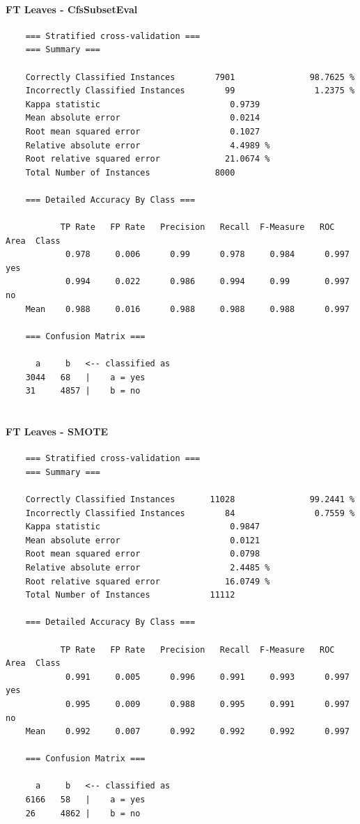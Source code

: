 \pagebreak
\paragraph{FT Leaves - CfsSubsetEval}
{\scriptsize
	\begin{verbatim}
	=== Stratified cross-validation ===
	=== Summary ===
	
	Correctly Classified Instances        7901               98.7625 %
	Incorrectly Classified Instances        99                1.2375 %
	Kappa statistic                          0.9739
	Mean absolute error                      0.0214
	Root mean squared error                  0.1027
	Relative absolute error                  4.4989 %
	Root relative squared error             21.0674 %
	Total Number of Instances             8000     
	
	=== Detailed Accuracy By Class ===
	
	       TP Rate   FP Rate   Precision   Recall  F-Measure   ROC Area  Class
	        0.978     0.006      0.99      0.978     0.984      0.997    yes
	        0.994     0.022      0.986     0.994     0.99       0.997    no
	Mean    0.988     0.016      0.988     0.988     0.988      0.997
	
	=== Confusion Matrix ===
	
	  a     b   <-- classified as
	3044   68   |    a = yes
	31     4857 |    b = no
	
	\end{verbatim}
}

\paragraph{FT Leaves - SMOTE}
{\scriptsize
	\begin{verbatim}
	=== Stratified cross-validation ===
	=== Summary ===
	
	Correctly Classified Instances       11028               99.2441 %
	Incorrectly Classified Instances        84                0.7559 %
	Kappa statistic                          0.9847
	Mean absolute error                      0.0121
	Root mean squared error                  0.0798
	Relative absolute error                  2.4485 %
	Root relative squared error             16.0749 %
	Total Number of Instances            11112     
	
	=== Detailed Accuracy By Class ===
	
	       TP Rate   FP Rate   Precision   Recall  F-Measure   ROC Area  Class
	        0.991     0.005      0.996     0.991     0.993      0.997    yes
	        0.995     0.009      0.988     0.995     0.991      0.997    no
	Mean    0.992     0.007      0.992     0.992     0.992      0.997
	
	=== Confusion Matrix ===
	
	  a     b   <-- classified as
	6166   58   |    a = yes
	26     4862 |    b = no
	\end{verbatim}
}
\pagebreak
